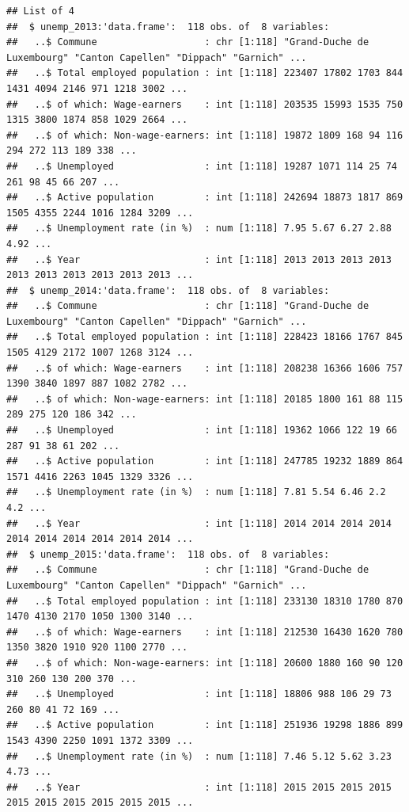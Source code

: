 \documentclass[]{gitbook}
\begin{document}
\begin{verbatim}
## List of 4
##  $ unemp_2013:'data.frame':  118 obs. of  8 variables:
##   ..$ Commune                   : chr [1:118] "Grand-Duche de Luxembourg" "Canton Capellen" "Dippach" "Garnich" ...
##   ..$ Total employed population : int [1:118] 223407 17802 1703 844 1431 4094 2146 971 1218 3002 ...
##   ..$ of which: Wage-earners    : int [1:118] 203535 15993 1535 750 1315 3800 1874 858 1029 2664 ...
##   ..$ of which: Non-wage-earners: int [1:118] 19872 1809 168 94 116 294 272 113 189 338 ...
##   ..$ Unemployed                : int [1:118] 19287 1071 114 25 74 261 98 45 66 207 ...
##   ..$ Active population         : int [1:118] 242694 18873 1817 869 1505 4355 2244 1016 1284 3209 ...
##   ..$ Unemployment rate (in %)  : num [1:118] 7.95 5.67 6.27 2.88 4.92 ...
##   ..$ Year                      : int [1:118] 2013 2013 2013 2013 2013 2013 2013 2013 2013 2013 ...
##  $ unemp_2014:'data.frame':  118 obs. of  8 variables:
##   ..$ Commune                   : chr [1:118] "Grand-Duche de Luxembourg" "Canton Capellen" "Dippach" "Garnich" ...
##   ..$ Total employed population : int [1:118] 228423 18166 1767 845 1505 4129 2172 1007 1268 3124 ...
##   ..$ of which: Wage-earners    : int [1:118] 208238 16366 1606 757 1390 3840 1897 887 1082 2782 ...
##   ..$ of which: Non-wage-earners: int [1:118] 20185 1800 161 88 115 289 275 120 186 342 ...
##   ..$ Unemployed                : int [1:118] 19362 1066 122 19 66 287 91 38 61 202 ...
##   ..$ Active population         : int [1:118] 247785 19232 1889 864 1571 4416 2263 1045 1329 3326 ...
##   ..$ Unemployment rate (in %)  : num [1:118] 7.81 5.54 6.46 2.2 4.2 ...
##   ..$ Year                      : int [1:118] 2014 2014 2014 2014 2014 2014 2014 2014 2014 2014 ...
##  $ unemp_2015:'data.frame':  118 obs. of  8 variables:
##   ..$ Commune                   : chr [1:118] "Grand-Duche de Luxembourg" "Canton Capellen" "Dippach" "Garnich" ...
##   ..$ Total employed population : int [1:118] 233130 18310 1780 870 1470 4130 2170 1050 1300 3140 ...
##   ..$ of which: Wage-earners    : int [1:118] 212530 16430 1620 780 1350 3820 1910 920 1100 2770 ...
##   ..$ of which: Non-wage-earners: int [1:118] 20600 1880 160 90 120 310 260 130 200 370 ...
##   ..$ Unemployed                : int [1:118] 18806 988 106 29 73 260 80 41 72 169 ...
##   ..$ Active population         : int [1:118] 251936 19298 1886 899 1543 4390 2250 1091 1372 3309 ...
##   ..$ Unemployment rate (in %)  : num [1:118] 7.46 5.12 5.62 3.23 4.73 ...
##   ..$ Year                      : int [1:118] 2015 2015 2015 2015 2015 2015 2015 2015 2015 2015 ...

\end{verbatim}
\end{document}

